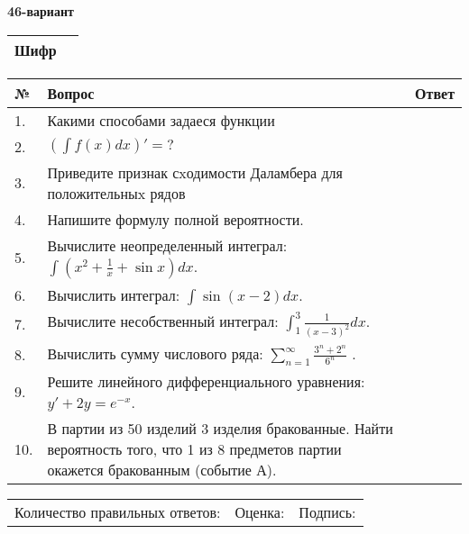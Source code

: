 \documentclass{article}
\begin{document}
  \egroup
  
  \newpage
  
  
  \textbf{46-вариант}\\
  
  \bgroup
  \def\arraystretch{1.6} %
  
  \begin{tabular}{|m{5.7cm}|m{9.5cm}|}
  \hline
  Шифр & \\
  \hline
  \end{tabular}
  
  \vspace{1cm}
  
  \begin{tabular}{|m{0.7cm}|m{10cm}|m{4cm}|}
  \hline
  № & Вопрос & Ответ \\
  \hline
  1. & Какими способами задаеся функции &  \\
  \hline
  2. & \(\left( \int{f(x)dx} \right)' = ?\) &  \\
  \hline
  3. & Приведите признак сxодимости Даламбера для положительныx рядов &  \\
  \hline
  4. & Напишите формулу полной вероятности. &  \\
  \hline
  5. & Вычислите неопределенный интеграл: \(\int{\left( x^{2} + \frac{1}{x} + \sin x \right)dx}\). &  \\
  \hline
  6. & Вычислить интеграл: \(\int{\sin(x - 2)dx}\). &  \\
  \hline
  7. & Вычислите несобственный интеграл: \(\int_{1}^{3}{\frac{1}{(x - 3)^{2}}dx}\). &  \\
  \hline
  8. & Вычислить сумму числового ряда: \(\sum_{n = 1}^{\infty}\frac{3^{n} + 2^{n}}{6^{n}}\) . &  \\
  \hline
  9. & Решите линейного дифференциального уравнения: \(y' + 2y = e^{- x}\). &  \\
  \hline
  10. & В партии из 50 изделий 3 изделия бракованные. Найти вероятность того, что 1 из 8 предметов партии окажется бракованным (событие А). &  \\
  \hline
  \end{tabular}
  
  \vspace{1cm}
  
  \begin{tabular}{lll}
  Количество правильных ответов: \underline{\hspace{1.5cm}} & 
  Оценка: \underline{\hspace{1.5cm}} & 
  Подпись: \underline{\hspace{2cm}} \\
  \end{tabular}
  
\end{document}
